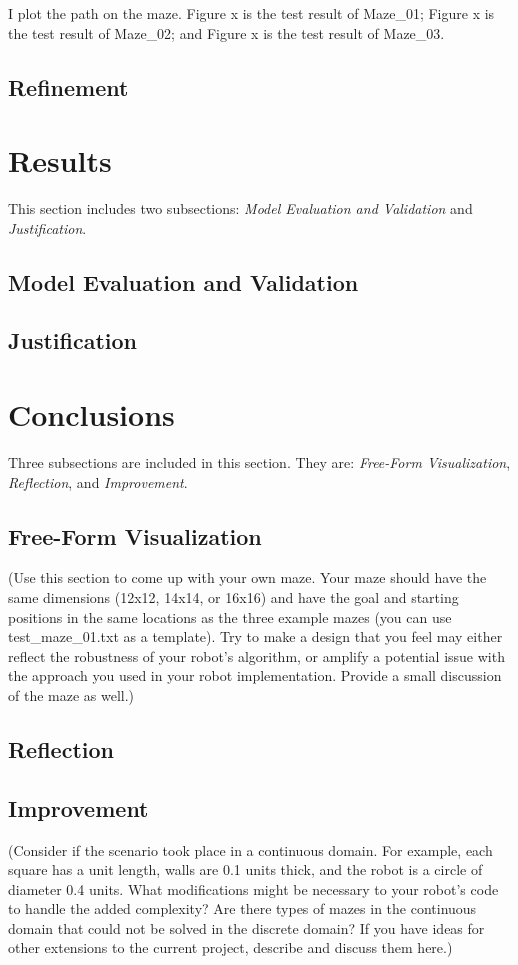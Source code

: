 \documentclass[11pt, oneside]{article}   	%
\begin{document}
I plot the path on the maze. Figure x is the test result of Maze\_01; Figure x is the test result of Maze\_02; and Figure x is the test result of Maze\_03. 




\subsection{Refinement}




\section{Results}
This section includes two subsections: {\it Model Evaluation and Validation} and {\it Justification}.
\subsection{Model Evaluation and Validation}
\subsection{Justification}


\section{Conclusions}
Three subsections are included in this section. They are: {\it Free-Form Visualization}, {\it Reflection}, and {\it Improvement}.
\subsection{Free-Form Visualization}
(Use this section to come up with your own maze. Your maze should have the same dimensions (12x12, 14x14, or 16x16) and have the goal and starting positions in the same locations as the three example mazes (you can use test\_maze\_01.txt as a template). Try to make a design that you feel may either reflect the robustness of your robot's algorithm, or amplify a potential issue with the approach you used in your robot implementation. Provide a small discussion of the maze as well.)
\subsection{Reflection}
\subsection{Improvement}
(Consider if the scenario took place in a continuous domain. For example, each square has a unit length, walls are 0.1 units thick, and the robot is a circle of diameter 0.4 units. What modifications might be necessary to your robot’s code to handle the added complexity? Are there types of mazes in the continuous domain that could not be solved in the discrete domain? If you have ideas for other extensions to the current project, describe and discuss them here.)
\end{document}
